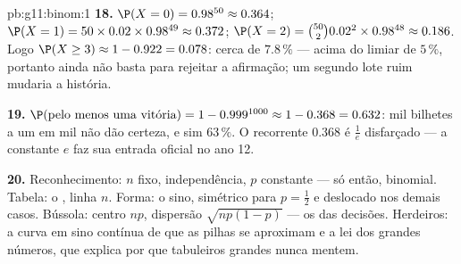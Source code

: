 \begin{solution}{pb:g11:binom:1}
\textbf{18.} $\P(X = 0) = 0.98^{50} \approx 0.364$;
$\P(X = 1) = 50 \times 0.02 \times 0.98^{49} \approx 0.372$;
$\P(X = 2) = \binom{50}{2} 0.02^2 \times 0.98^{48} \approx
0.186$. Logo $\P(X \geq 3) \approx 1 - 0.922 = 0.078$: cerca de
$7.8\,\%$ --- acima do limiar de $5\,\%$, portanto ainda não
basta para rejeitar a afirmação; um segundo lote ruim mudaria a
história.

\textbf{19.} $\P(\text{pelo menos uma vitória}) = 1 -
0.999^{1000} \approx 1 - 0.368 = 0.632$: mil bilhetes a um em
mil não dão certeza, e sim $63\,\%$. O recorrente $0.368$ é
$\frac1e$ disfarçado --- a constante $e$ faz sua entrada oficial
no ano 12.

\textbf{20.} Reconhecimento: $n$ fixo, independência, $p$
constante --- só então, binomial. Tabela: o , linha $n$. Forma: o sino, simétrico para $p = \frac12$
e deslocado nos demais casos. Bússola: centro $np$, dispersão
$\sqrt{np(1-p)}$ --- os  das decisões. Herdeiros: a
curva em sino contínua de que as pilhas se aproximam e a lei
dos grandes números, que explica por que tabuleiros grandes
nunca mentem.
\end{solution}
